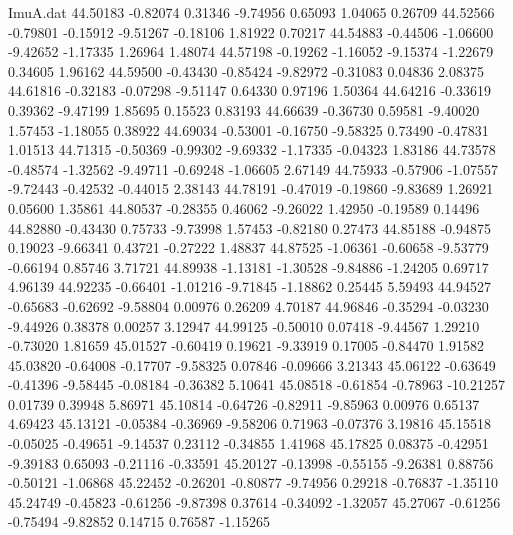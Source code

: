 \begin{filecontents}{ImuA.dat}
  44.50183   -0.82074    0.31346   -9.74956    0.65093    1.04065    0.26709
  44.52566   -0.79801   -0.15912   -9.51267   -0.18106    1.81922    0.70217
  44.54883   -0.44506   -1.06600   -9.42652   -1.17335    1.26964    1.48074
  44.57198   -0.19262   -1.16052   -9.15374   -1.22679    0.34605    1.96162
  44.59500   -0.43430   -0.85424   -9.82972   -0.31083    0.04836    2.08375
  44.61816   -0.32183   -0.07298   -9.51147    0.64330    0.97196    1.50364
  44.64216   -0.33619    0.39362   -9.47199    1.85695    0.15523    0.83193
  44.66639   -0.36730    0.59581   -9.40020    1.57453   -1.18055    0.38922
  44.69034   -0.53001   -0.16750   -9.58325    0.73490   -0.47831    1.01513
  44.71315   -0.50369   -0.99302   -9.69332   -1.17335   -0.04323    1.83186
  44.73578   -0.48574   -1.32562   -9.49711   -0.69248   -1.06605    2.67149
  44.75933   -0.57906   -1.07557   -9.72443   -0.42532   -0.44015    2.38143
  44.78191   -0.47019   -0.19860   -9.83689    1.26921    0.05600    1.35861
  44.80537   -0.28355    0.46062   -9.26022    1.42950   -0.19589    0.14496
  44.82880   -0.43430    0.75733   -9.73998    1.57453   -0.82180    0.27473
  44.85188   -0.94875    0.19023   -9.66341    0.43721   -0.27222    1.48837
  44.87525   -1.06361   -0.60658   -9.53779   -0.66194    0.85746    3.71721
  44.89938   -1.13181   -1.30528   -9.84886   -1.24205    0.69717    4.96139
  44.92235   -0.66401   -1.01216   -9.71845   -1.18862    0.25445    5.59493
  44.94527   -0.65683   -0.62692   -9.58804    0.00976    0.26209    4.70187
  44.96846   -0.35294   -0.03230   -9.44926    0.38378    0.00257    3.12947
  44.99125   -0.50010    0.07418   -9.44567    1.29210   -0.73020    1.81659
  45.01527   -0.60419    0.19621   -9.33919    0.17005   -0.84470    1.91582
  45.03820   -0.64008   -0.17707   -9.58325    0.07846   -0.09666    3.21343
  45.06122   -0.63649   -0.41396   -9.58445   -0.08184   -0.36382    5.10641
  45.08518   -0.61854   -0.78963  -10.21257    0.01739    0.39948    5.86971
  45.10814   -0.64726   -0.82911   -9.85963    0.00976    0.65137    4.69423
  45.13121   -0.05384   -0.36969   -9.58206    0.71963   -0.07376    3.19816
  45.15518   -0.05025   -0.49651   -9.14537    0.23112   -0.34855    1.41968
  45.17825    0.08375   -0.42951   -9.39183    0.65093   -0.21116   -0.33591
  45.20127   -0.13998   -0.55155   -9.26381    0.88756   -0.50121   -1.06868
  45.22452   -0.26201   -0.80877   -9.74956    0.29218   -0.76837   -1.35110
  45.24749   -0.45823   -0.61256   -9.87398    0.37614   -0.34092   -1.32057
  45.27067   -0.61256   -0.75494   -9.82852    0.14715    0.76587   -1.15265

\end{filecontents}
